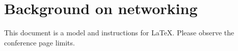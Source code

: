 
\section{Background on networking}
This document is a model and instructions for LaTeX.
Please observe the conference page limits.
